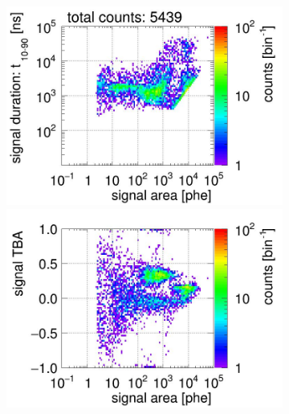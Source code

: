 \begin{landscape}
\begin{figure}[!p]
\begin{subfigure}[t]{0.33\textwidth}
	\caption{}
	\label{fig:signal selection 05}
\end{subfigure}
	\begin{subfigure}[t]{0.33\textwidth}
	\centering
	\includegraphics[width=\figurewidth,clip,trim={0 98 0 0}]{Figures/GasTest/CutsValid/res64767/pdpa06Vecfig64767.jpg}
	\includegraphics[width=\figurewidth,clip,trim={0 98 0 40}]{Figures/GasTest/CutsValid/res64767/tbapa06Vecfig64767.jpg}

\end{subfigure}
\end{figure}
\end{landscape}
